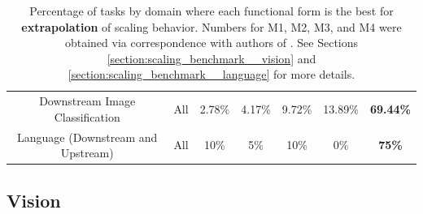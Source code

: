 \documentclass{article} %
\begin{document}
\begin{table}[hbt!]
\begin{tabular}{ |cH|c|c|c|c|c| }
Downstream Image Classification & All & 2.78\% & 4.17\% & 9.72\% & 13.89\% & \bfseries 69.44\%\\
 Language (Downstream and Upstream) & All & 10\% & 5\% & 10\% & 0\% & \bfseries 75\%\\
 \hline
\end{tabular}
\vspace{-2.1mm}
    \caption{
    Percentage of tasks by domain where each functional form is the best for \textbf{extrapolation} of scaling behavior. Numbers for M1, M2, M3, and M4 were obtained via correspondence with authors of \cite{Alabdulmohsi2022revisiting}. See Sections \ref{section:scaling_benchmark__vision} and \ref{section:scaling_benchmark__language} for more details.
    }
    \label{table:scaling_laws_benchmark_dataset__summary}
\end{table}

\FloatBarrier
\vspace{-3.4mm}
\subsection{Vision}
\vspace{-1.5mm}
\label{section:scaling_benchmark__vision}
\end{document}
